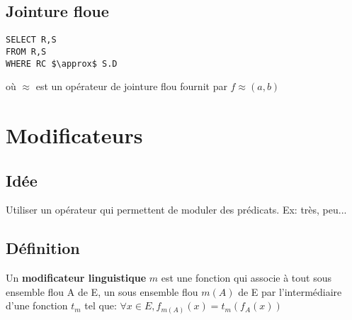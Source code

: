 \documentclass[a4paper,11pt]{article}
\begin{document}
\subsection{Jointure floue}
 
\begin{lstlisting}[mathescape]
SELECT R,S
FROM R,S
WHERE RC $\approx$ S.D
\end{lstlisting}
où $\approx$ est un opérateur de jointure flou fournit par $f \approx (a,b)$ 


\section{Modificateurs}
\subsection{Idée}
Utiliser un opérateur qui permettent de moduler des prédicats. Ex: très, peu...
\subsection{Définition}
Un \textbf{modificateur linguistique} $m$ est une fonction qui associe à tout sous ensemble flou A de E, un sous ensemble flou $m(A)$ de E par l'intermédiaire d'une fonction $t_m$ tel que:
$\forall x \in E,f_{m(A)}(x)=t_m(f_A(x)) $
\end{document}
